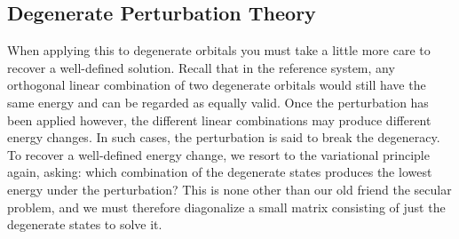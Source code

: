 \documentclass{article}
\theoremstyle{plain}\theoremheaderfont{\normalfont\itshape}\theorembodyfont{\rmfamily}\theoremseparator{.}\newtheorem*{rem}{Remark}\newtheorem*{ex}{Example}\newtheorem*{proof}{Proof}\newtheorem*{altp}{Alternative proof}
\theoremstyle{plain}\theoremheaderfont{\normalfont\bfseries}\theorembodyfont{\rmfamily}\theoremseparator{.}\newtheorem{thm}{Theorem}[section]\newtheorem{lem}[thm]{Lemma}\newtheorem{prop}[thm]{Proposition}\newtheorem*{cor}{Corollary}\newtheorem{defn}[thm]{Definition}\newtheorem{clm}[thm]{Claim}\newtheorem{clminproof}{Claim}\newtheorem{pos}{Postulate}[section]
\theoremstyle{break}\theoremheaderfont{\normalfont\itshape}\theorembodyfont{\rmfamily}\theoremseparator{.\medskip}\newtheorem*{proofskip}{Proof}\newtheorem*{exs}{Examples}\newtheorem*{rems}{Remarks}
\theoremstyle{break}\theoremheaderfont{\normalfont\bfseries}\theorembodyfont{\rmfamily}\theoremseparator{.\medskip}\newtheorem{lemskip}[thm]{Lemma}\newtheorem{defnskip}[thm]{Definition}\newtheorem{propskip}[thm]{Proposition}\newtheorem{thmskip}[thm]{Theorem}
\numberwithin{equation}{section}
\begin{document}
    \subsection{Degenerate Perturbation Theory}
    When applying this to degenerate orbitals you must take a little more care to recover a well-defined solution. Recall that in the reference system, any orthogonal linear combination of two degenerate orbitals would still have the same energy and can be regarded as equally valid. Once the perturbation has been applied however, the different linear combinations may produce different energy changes. In such cases, the perturbation is said to break the degeneracy. To recover a well-defined energy change, we resort to the variational principle again, asking: which combination of the degenerate states produces the lowest energy under the perturbation? This is none other than our old friend the secular problem, and we must therefore diagonalize a small matrix consisting of just the degenerate states to solve it.
\end{document}
